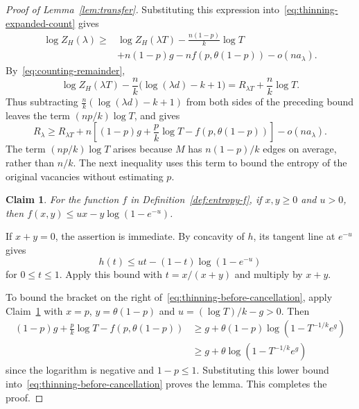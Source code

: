 \documentclass[11pt,reqno]{amsart}
\makeatletter
\numberwithin{equation}{section}
\theoremstyle{plain}
\newtheorem{claim}{Claim}[section]
\newenvironment{claimproof}[1][Proof]{\par
    \pushQED{\qed}%
    \renewcommand{\qedsymbol}{$\blacksquare$}
    \normalfont \topsep6\p@\@plus6\p@\relax
    \trivlist
    \item[\hskip\labelsep
    \textit{#1}\@addpunct{.}~]\ignorespaces
}{%
    \popQED\endtrivlist\@endpefalse
}
\theoremstyle{definition}
\makeatother
\begin{document}
\begin{proof}[Proof of Lemma~\ref{lem:transfer}]
    Substituting this expression into~\eqref{eq:thinning-expanded-count} gives
    \[
        \begin{aligned}
            \log Z_H(\lambda)\ge{}&\log Z_H(\lambda T)-\frac{n(1-p)}k\log T\\
            &+n(1-p)g-nf(p,\theta(1-p))-o(na_\lambda).
        \end{aligned}
    \]
    By~\eqref{eq:counting-remainder},
    \[
        \log Z_H(\lambda T)-\frac nk\bigl(\log(\lambda d)-k+1\bigr)
        =R_{\lambda T}+\frac nk\log T.
    \]
    Thus subtracting $\frac nk(\log(\lambda d)-k+1)$ from both sides of the preceding bound leaves the term $(np/k)\log T$, and gives
    \begin{equation}\label{eq:thinning-before-cancellation}
        R_\lambda\ge R_{\lambda T}+n\left[(1-p)g+\frac pk\log T-f(p,\theta(1-p))\right]-o(na_\lambda).
    \end{equation}
    The term $(np/k)\log T$ arises because $M$ has $n(1-p)/k$ edges on average, rather than $n/k$.
    The next inequality uses this term to bound the entropy of the original vacancies without estimating $p$.

    \begin{claim}\label{clm:binaryentropy}
        For the function $f$ in Definition~\ref{def:entropy-f}, if $x,y\ge0$ and $u>0$, then $f(x,y)\le ux-y\log(1-e^{-u})$.
    \end{claim}
    \begin{claimproof}[Proof of Claim~\ref{clm:binaryentropy}]
        If $x+y=0$, the assertion is immediate.
        By concavity of $h$, its tangent line at $e^{-u}$ gives
        \[
            h(t)\le ut-(1-t)\log(1-e^{-u})
        \]
        for $0\le t\le1$.
        Apply this bound with $t=x/(x+y)$ and multiply by $x+y$.
    \end{claimproof}

    To bound the bracket on the right of~\eqref{eq:thinning-before-cancellation}, apply Claim~\ref{clm:binaryentropy} with $x=p$, $y=\theta(1-p)$ and $u=(\log T)/k-g>0$.
    Then
    \begin{align*}
        (1-p)g+\frac pk\log T-f(p,\theta(1-p))
        & \ge g+\theta(1-p)\log(1-T^{-1/k}e^g)\\
        & \ge g+\theta\log(1-T^{-1/k}e^g)
    \end{align*}
    since the logarithm is negative and $1-p\le1$.
    Substituting this lower bound into~\eqref{eq:thinning-before-cancellation} proves the lemma.
    This completes the proof.
\end{proof}
\end{document}
